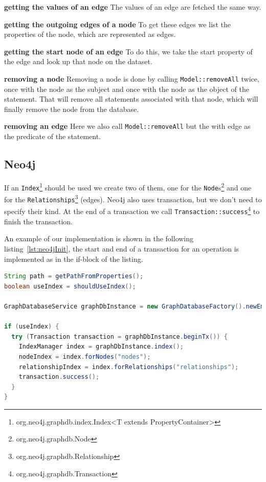 \textbf{getting the values of an edge} \newline
The values of an edge are fetched the same way.

\textbf{getting the outgoing edges of a node} \newline
To get these edges we list the properties of the node,
which are represented as edges.

\textbf{getting the start node of an edge} \newline
To do this,
we take the start property of the edge and look up that node on the dataset.

\textbf{removing a node} \newline
Removing a node is done by calling \texttt{Model::removeAll} twice,
once with the node as the subject and once with the node as the object of the statement.
That will remove all statements associated with that node,
which will finally remove the node from the database.

\textbf{removing an edge} \newline
Here we also call \texttt{Model::removeAll} but the with edge as the predicate of the statement.

\subsection{Neo4j}
If an \texttt{Index}\footnote{org.neo4j.graphdb.index.Index<T extends PropertyContainer>} should be used we create two of them,
one for the \texttt{Node}s\footnote{org.neo4j.graphdb.Node} and one for the \texttt{Relationships}\footnote{org.neo4j.graphdb.Relationship} (edges).
Neo4j also uses transaction,
but we don't need to specify their kind.
At the end of a transaction we call \texttt{Transaction::success}\footnote{org.neo4j.graphdb.Transaction} to finish the transaction.

An example of our implementation is shown in the following listing~\ref{lst:neo4jInit}, the start and end of a transaction for an operation is implemented as in the if-block of the listing.

\begin{lstlisting}[language=Java,label={lst:neo4jInit},caption={Implementation of the initialisation and beginning of a transaction.}]
String path = getPathFromProperties();
boolean useIndex = shouldUseIndex();

GraphDatabaseService graphDbInstance = new GraphDatabaseFactory().newEmbeddedDatabase(new File(path));

if (useIndex) {
  try (Transaction transaction = graphDbInstance.beginTx()) {
    IndexManager index = graphDbInstance.index();
    nodeIndex = index.forNodes("nodes");
    relationshipIndex = index.forRelationships("relationships");
    transaction.success();
  }
}
\end{lstlisting}

